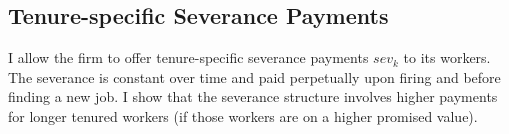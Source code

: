 


\subsection{Tenure-specific Severance Payments}
I allow the firm to offer tenure-specific severance payments $sev_k$ to its workers. The severance is constant over time and paid perpetually upon firing and before finding a new job. I show that the severance structure involves higher payments for longer tenured workers (if those workers are on a higher promised value). 

